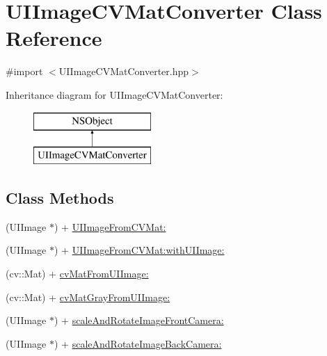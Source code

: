 \hypertarget{interface_u_i_image_c_v_mat_converter}{\section{U\+I\+Image\+C\+V\+Mat\+Converter Class Reference}
\label{interface_u_i_image_c_v_mat_converter}
}


{\ttfamily \#import $<$U\+I\+Image\+C\+V\+Mat\+Converter.\+hpp$>$}

Inheritance diagram for U\+I\+Image\+C\+V\+Mat\+Converter\+:\begin{figure}[H]
\begin{center}
\leavevmode
\includegraphics[height=2.000000cm]{interface_u_i_image_c_v_mat_converter}
\end{center}
\end{figure}
\subsection*{Class Methods}
\begin{DoxyCompactItemize}
\item 
(U\+I\+Image $\ast$) + \hyperlink{interface_u_i_image_c_v_mat_converter_ae96cde81129f965a43427053199cd92d}{U\+I\+Image\+From\+C\+V\+Mat\+:}
\item 
(U\+I\+Image $\ast$) + \hyperlink{interface_u_i_image_c_v_mat_converter_abd5e5c4c7280d04fffea79737b556507}{U\+I\+Image\+From\+C\+V\+Mat\+:with\+U\+I\+Image\+:}
\item 
(cv\+::\+Mat) + \hyperlink{interface_u_i_image_c_v_mat_converter_abeefe1d140e9bdd660b07d1dabce66f1}{cv\+Mat\+From\+U\+I\+Image\+:}
\item 
(cv\+::\+Mat) + \hyperlink{interface_u_i_image_c_v_mat_converter_adcff189c46b8a96188a10775f133138f}{cv\+Mat\+Gray\+From\+U\+I\+Image\+:}
\item 
(U\+I\+Image $\ast$) + \hyperlink{interface_u_i_image_c_v_mat_converter_a6f3591f2805f153289fae9fb8e50ca67}{scale\+And\+Rotate\+Image\+Front\+Camera\+:}
\item 
(U\+I\+Image $\ast$) + \hyperlink{interface_u_i_image_c_v_mat_converter_a92e5de957061495ab6c3f1cadfafa2f9}{scale\+And\+Rotate\+Image\+Back\+Camera\+:}
\end{DoxyCompactItemize}


